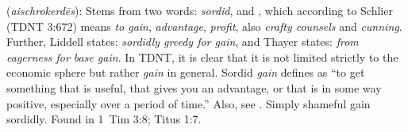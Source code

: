 \item[Sordid gain,]

(\textit{aischrokerdēs}):
Stems from two words:  \emph{sordid}, and , which according to Schlier (TDNT 3:672) means \emph{to gain}, \emph{advantage}, \emph{profit}, also \emph{crafty counsels} and \emph{cunning}. Further, Liddell states: \emph{sordidly greedy for gain}, and Thayer states: \emph{from eagerness for base gain}. In TDNT, it is clear that it is not limited strictly to the economic sphere but rather \emph{gain} in general. Sordid \emph{gain} defines as ``to get something that is useful, that gives you an advantage, or that is in some way positive, especially over a period of time.'' Also, see . Simply shameful gain sordidly.
Found in 1~Tim 3:8; Titus 1:7.
